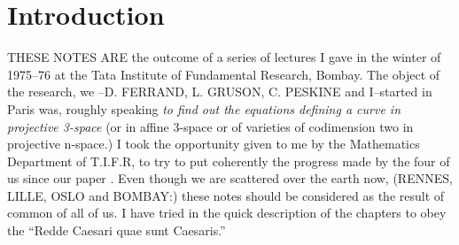 \chapter{Introduction}


THESE NOTES ARE the outcome of a series of lectures I gave 
in the winter of 1975--76 at the Tata Institute of Fundamental Research,
Bombay. The object of the research, we --D. FERRAND, L. GRUSON,
C. PESKINE and I--started in Paris was, roughly speaking {\it to find
out the equations defining a curve in projective 3-space} (or in
affine 3-space or of varieties of codimension two in projective
n-space.) I took the opportunity given to me by the Mathematics
Department of T.I.F.R, to try to put coherently the progress made by
the four of us since our paper \cite{key11}. Even though we are scattered over
the earth now, (RENNES, LILLE, OSLO and BOMBAY:) these notes should be
considered as the result of common of all of us. I have tried in the
quick description of the chapters to obey the ``Redde Caesari quae
sunt Caesaris.'' 

